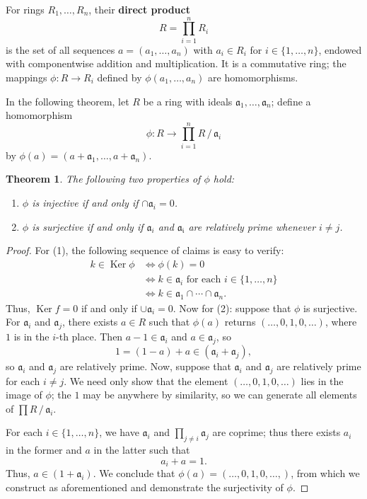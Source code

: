 \documentclass[11pt]{article}
\newtheorem{theorem}{Theorem}
\newcommand{\Ker}{\operatorname{Ker}}
\begin{document}
For rings $R_{1}, \ldots, R_{n}$, their \textbf{direct product} 
\[
	R = \prod\limits_{i = 1}^{n} R_{i}
\]
is the set of all sequences $a = (a_{1}, \ldots, a_{n})$ with $a_{i} \in R_{i}$ for $i \in \{ 1, \ldots, n \}$, endowed with componentwise addition and multiplication. It is a commutative ring; the mappings $\phi : R \to R_{i}$ defined by $\phi(a_{1}, \ldots, a_{n})$ are homomorphisms.

In the following theorem, let $R$ be a ring with ideals $\mathfrak{a}_{1}, \ldots, \mathfrak{a}_{n}$; define a homomorphism
\[
	\phi : R \to \prod_{i = 1}^{n} R \,/\, \mathfrak{a}_{i}
\]
by $\phi(a) = (a + \mathfrak{a}_{1}, \ldots, a + \mathfrak{a}_{n})$.

\begin{adjustwidth}{0.5cm}{}
	\begin{theorem}
		The following two properties of $\phi$ hold:
		\begin{enumerate}
			\item $\phi$ is injective if and only if $\cap \mathfrak{a}_{i} = 0$.
			\item $\phi$ is surjective if and only if $\mathfrak{a}_{i}$ and $\mathfrak{a_{i}}$ are relatively prime whenever $i \ne j$.
		\end{enumerate}
	\end{theorem}
	\begin{proof}
		For (1), the following sequence of claims is easy to verify:
		\begin{align*}
			k \in \Ker \phi &\iff \phi(k) = 0 \\
			&\iff k \in \mathfrak{a}_{i} \text{ for each } i \in \{ 1, \ldots, n \} \\
			&\iff k \in \mathfrak{a}_{1} \cap \cdots \cap \mathfrak{a}_{n}.
		\end{align*}
		 Thus, $\Ker f = 0$ if and only if $\cup \mathfrak{a}_{i} = 0$. Now for (2): suppose that $\phi$ is surjective. For $\mathfrak{a}_{i}$ and $\mathfrak{a}_{j}$, there exists $a \in R$ such that $\phi(a)$ returns $(\ldots, 0, 1, 0, \ldots)$, where $1$ is in the $i$-th place. Then $a - 1 \in \mathfrak{a}_{i}$ and $a \in \mathfrak{a}_{j}$, so
		 \[
		 	1  = (1 - a) + a \in (\mathfrak{a}_{i} + \mathfrak{a}_{j}),
		 \]
		so $\mathfrak{a}_{i}$ and $\mathfrak{a}_{j}$ are relatively prime. Now, suppose that $\mathfrak{a}_{i}$ and $\mathfrak{a}_{j}$ are relatively prime for each $i \ne j$. We need only show that the element $(\ldots, 0, 1, 0, \ldots)$ lies in the image of $\phi$; the $1$ may be anywhere by similarity, so we can generate all elements of $\prod R \,/\, \mathfrak{a}_{i}$.

		For each $i \in \{ 1, \ldots, n \}$, we have $\mathfrak{a}_{i}$ and $\prod_{j \ne i} \mathfrak{a}_{j}$ are coprime; thus there exists $a_{i}$ in the former and $a$ in the latter such that
		\[
			a_{i} + a = 1.
		\]
		Thus, $a \in (1 + \mathfrak{a}_{i})$. We conclude that $\phi(a) = (\ldots, 0, 1, 0, \ldots,)$, from which we construct as aforementioned and demonstrate the surjectivity of $\phi$.
	\end{proof}
\end{adjustwidth}
\end{document}
